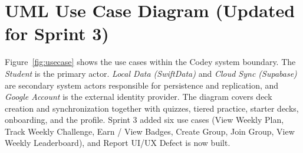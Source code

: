\documentclass[12pt,letterpaper]{article}
\begin{document}
\section{UML Use Case Diagram (Updated for Sprint 3)}\label{sec:usecase}
Figure~\ref{fig:usecase} shows the use cases within the Codey system boundary. The
\emph{Student} is the primary actor. \emph{Local Data (SwiftData)} and \emph{Cloud
Sync (Supabase)} are secondary system actors responsible for persistence and
replication, and \emph{Google Account} is the external identity provider. The
diagram covers deck creation and synchronization together with quizzes, tiered
practice, starter decks, onboarding, and the profile. Sprint 3 added six use cases
(View Weekly Plan, Track Weekly Challenge, Earn / View Badges, Create Group, Join
Group, View Weekly Leaderboard), and Report UI/UX Defect is now built.
\end{document}
